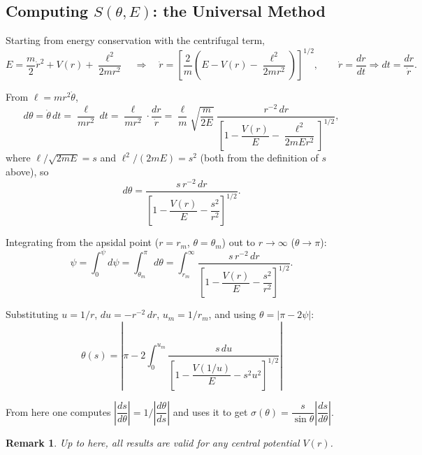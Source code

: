 \documentclass[11pt]{article}
\newtheorem{remark}{Remark}
\begin{document}
\subsection{Computing $S(\theta,E)$: the Universal Method}

Starting from energy conservation with the centrifugal term,
\[
E = \frac{m}{2}\dot r^2 + V(r) + \frac{\ell^2}{2mr^2}
\quad\Longrightarrow\quad
\dot r = \left[\frac{2}{m}\left(E - V(r) - \frac{\ell^2}{2mr^2}\right)\right]^{1/2},
\qquad \dot r = \frac{dr}{dt} \Rightarrow dt = \frac{dr}{\dot r}.
\]

From $\ell = m r^2 \dot\theta$,
\[
d\theta = \dot\theta\, dt = \frac{\ell}{mr^2}\,dt = \frac{\ell}{mr^2}\cdot\frac{dr}{\dot r}
= \frac{\ell}{m}\sqrt{\frac{m}{2E}}\; \frac{r^{-2}\,dr}{\left[1 - \dfrac{V(r)}{E} - \dfrac{\ell^2}{2mEr^2}\right]^{1/2}},
\]
where $\ell/\sqrt{2mE} = s$ and $\ell^2/(2mE) = s^2$ (both from the definition of $s$ above), so
\begin{equation}
d\theta = \frac{s\,r^{-2}\,dr}{\left[1 - \dfrac{V(r)}{E} - \dfrac{s^2}{r^2}\right]^{1/2}}.
\end{equation}

Integrating from the apsidal point ($r=r_m$, $\theta=\theta_m$) out to $r\to\infty$ ($\theta\to\pi$):
\[
\psi = \int_0^\psi d\psi = \int_{\theta_m}^{\pi} d\theta = \int_{r_m}^{\infty} \frac{s\,r^{-2}\,dr}{\left[1-\dfrac{V(r)}{E}-\dfrac{s^2}{r^2}\right]^{1/2}}.
\]

Substituting $u = 1/r$, $du = -r^{-2}\,dr$, $u_m = 1/r_m$, and using $\theta = |\pi-2\psi|$:
\begin{equation}
\boxed{\theta(s) = \left|\pi - 2\int_0^{u_m} \frac{s\,du}{\left[1 - \dfrac{V(1/u)}{E} - s^2u^2\right]^{1/2}}\right|}
\end{equation}

From here one computes $\left|\dfrac{ds}{d\theta}\right| = 1\Big/\left|\dfrac{d\theta}{ds}\right|$
and uses it to get $\sigma(\theta) = \dfrac{s}{\sin\theta}\left|\dfrac{ds}{d\theta}\right|$.

\begin{remark}
Up to here, all results are valid for \emph{any} central potential $V(r)$.
\end{remark}
\end{document}
